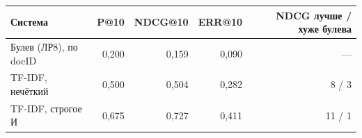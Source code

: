 \begin{tabular}{|l|r|r|r|r|}
\hline
Система & P@10 & NDCG@10 & ERR@10 & NDCG лучше / хуже булева \\
\hline
Булев (ЛР8), по docID & 0,200 & 0,159 & 0,090 & --- \\
\hline
TF-IDF, нечёткий & 0,500 & 0,504 & 0,282 & 8 / 3 \\
\hline
TF-IDF, строгое И & 0,675 & 0,727 & 0,411 & 11 / 1 \\
\hline
\end{tabular}
